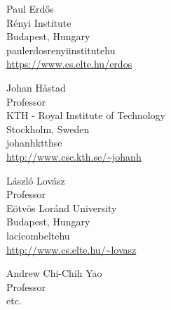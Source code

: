 \documentclass{aic}
\begin{document}
\begin{aicauthors}
\begin{authorinfo}[pgom]
  Paul Erd\H{o}s\\
  R\'enyi Institute\\
  Budapest, Hungary\\
  paulerdos\imageat{}renyiinstitute\imagedot{}hu \\
  \url{https://www.cs.elte.hu/erdos}
\end{authorinfo}
\begin{authorinfo}[johan]
  Johan H{\aa}stad\\
  Professor\\
  KTH - Royal Institute of Technology\\
  Stockholm, Sweden\\
  johanh\imageat{}ktth\imagedot{}se \\
  \url{http://www.csc.kth.se/~johanh}
\end{authorinfo}
\begin{authorinfo}[laci]
  L\'aszl\'o Lov\'asz\\
  Professor\\
  E\"otv\"os Lor\'and University\\
  Budapest, Hungary\\
  laci\imageat{}comb\imagedot{}elte\imagedot{}hu\\
  \url{http://www.cs.elte.hu/~lovasz}
\end{authorinfo}
\begin{authorinfo}[andy]
  Andrew Chi-Chih Yao\\
  Professor\\
  etc.
\end{authorinfo}
\end{aicauthors}
\end{document}
